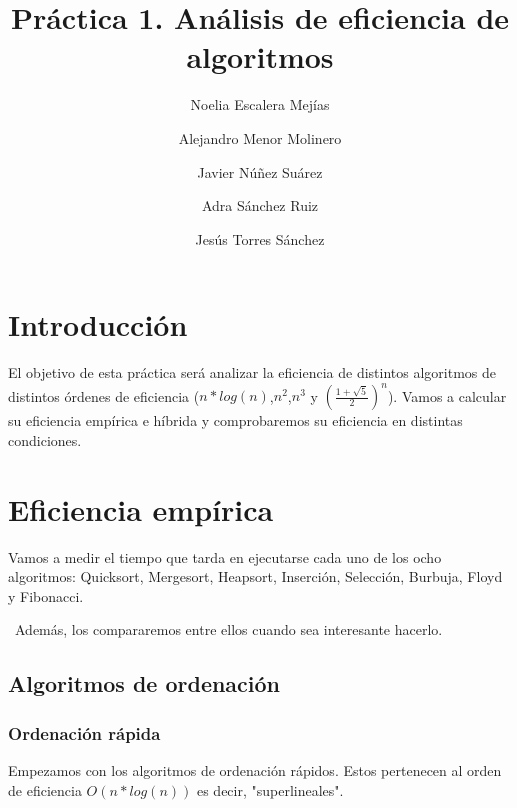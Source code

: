 \documentclass{article}
\title{Práctica 1. Análisis de eficiencia de algoritmos}
\author{Noelia Escalera Mejías \\
		\and Alejandro Menor Molinero \\
		\and Javier Núñez Suárez \\
		\and Adra Sánchez Ruiz \\
		\and Jesús Torres Sánchez}
\begin{document}
	\maketitle
	\section{Introducción}
	El objetivo de esta práctica será analizar la eficiencia de distintos algoritmos de distintos órdenes de eficiencia ($n*log(n)$,$n^2$,$n^3$ y $(\frac{1+\sqrt{5}}{2})^n$). Vamos a calcular su eficiencia empírica e híbrida y comprobaremos su eficiencia en distintas condiciones.
	\section{Eficiencia empírica}
	Vamos a medir el tiempo que tarda en ejecutarse cada uno de los ocho algoritmos: Quicksort, Mergesort, Heapsort, Inserción, Selección, Burbuja, Floyd y Fibonacci.
	
	\
	Además, los compararemos entre ellos cuando sea interesante hacerlo.
	\subsection{Algoritmos de ordenación}
	\subsubsection{Ordenación rápida}
	Empezamos con los algoritmos de ordenación rápidos. Estos pertenecen al orden de eficiencia $O(n*log(n))$ es decir, "superlineales".
	
\end{document}
